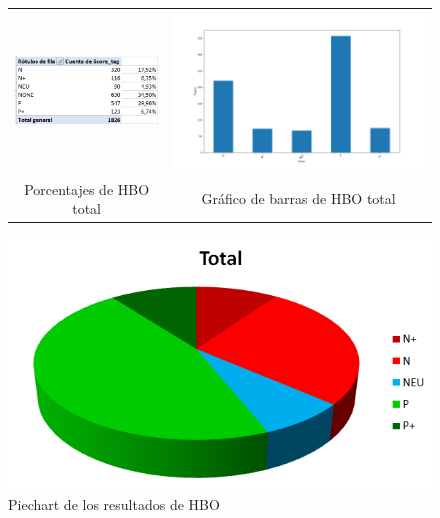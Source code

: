 \begin{figure}[H]
	\centering
	\begin{tabular}{c c}
		
		\includegraphics[scale=.7]{imagenes/porcentajeHBOAll-NONE.png}
		&  \includegraphics[scale=.6]{imagenes/barrasHBOAll.png} \\ 
		
		{Porcentajes de HBO total}
		
		&  {Gráfico de barras de HBO total} \\ 
		
	\end{tabular} 
	\label{fig:HBOAll}
\end{figure}


\begin{figure}[H]
	\centering
	\includegraphics[scale=1]{imagenes/piechartHBOAll.PNG}
	\caption{Piechart de los resultados de HBO}
	\label{fig:piechartHBOAll}
\end{figure}

